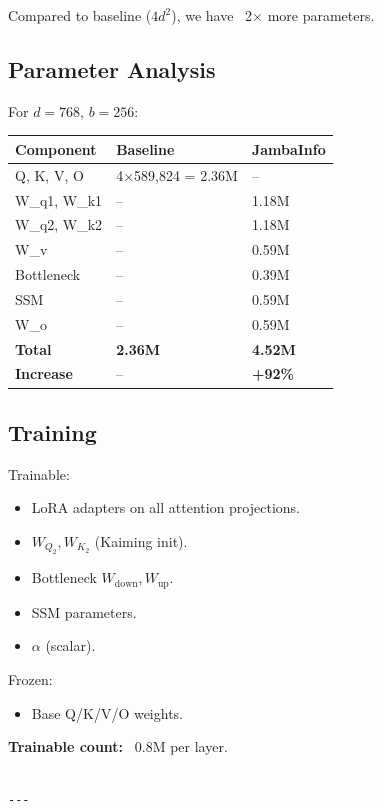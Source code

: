 Compared to baseline ($4 d^2$), we have ~2$\times$ more parameters.

\subsection{Parameter Analysis}

For $d = 768$, $b = 256$:

\begin{table}[H]
\centering
\small
\begin{tabular}{lll}
\toprule
\textbf{Component} & \textbf{Baseline} & \textbf{JambaInfo} \\
\midrule
Q, K, V, O & 4$\times$589,824 = 2.36M & -- \\
W\_q1, W\_k1 & -- & 1.18M \\
W\_q2, W\_k2 & -- & 1.18M \\
W\_v & -- & 0.59M \\
Bottleneck & -- & 0.39M \\
SSM & -- & 0.59M \\
W\_o & -- & 0.59M \\
\textbf{Total} & \textbf{2.36M} & \textbf{4.52M} \\
\textbf{Increase} & -- & \textbf{+92\%} \\
\bottomrule
\end{tabular}
\end{table}

\subsection{Training}

Trainable:
\begin{itemize}
\item LoRA adapters on all attention projections.
\item $W_{Q_2}, W_{K_2}$ (Kaiming init).
\item Bottleneck $W_\text{down}, W_\text{up}$.
\item SSM parameters.
\item $\alpha$ (scalar).

\end{itemize}
Frozen:
\begin{itemize}
\item Base Q/K/V/O weights.

\end{itemize}
\textbf{Trainable count:} ~0.8M per layer.
\begin{lstlisting}

---
\end{lstlisting}

